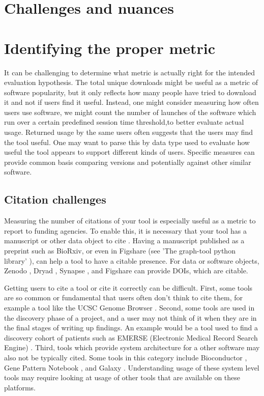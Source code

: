 \documentclass{article}
\begin{document}
\section{Challenges and nuances}

\section{Identifying the proper metric}

 It can be challenging to determine what metric is actually right for the intended evaluation hypothesis. The total unique downloads might be useful as a metric of software popularity, but it only reflects how many people have tried to download it and not if users find it useful. Instead, one might consider measuring how often users use software, we might count the number of launches of the software which run over a certain predefined session time threshold,to better evaluate actual usage. Returned usage by the same users often suggests that the users may find the tool useful. One may want to parse this by data type used to evaluate how useful the tool appears to support different kinds of users.   Specific measures can provide common basis comparing versions and potentially against other similar software. 

\subsection{Citation challenges}
Measuring the number of citations of your tool is especially useful as a metric to report to funding agencies. To enable this, it is necessary that your tool has a manuscript or other data object to cite \cite{chue_hong_software_2019}. Having a manuscript published as a preprint such as BioRxiv, or even in Figshare (see 'The graph-tool python library' \cite{peixoto_graph-tool_2017}), can help a tool to have a citable presence. For data or software objects, Zenodo \cite{zenodo}, Dryad \cite{datadryad}, Synapse \cite{synapse}, and Figshare \cite{figshare} can provide DOIs, which are citable. 

Getting users to cite a tool or cite it correctly can be difficult. First, some tools are so common or fundamental that users often don't think to cite them, for example a tool like the UCSC Genome Browser \cite{ucsc, kent_human_2002}. Second, some tools are used in the discovery phase of a project, and a user may not think of it when they are in the final stages of writing up findings. An example would be a tool used to find a discovery cohort of patients such as EMERSE (Electronic Medical Record Search Engine) \cite{hanauer_supporting_2015}. Third, tools which provide system architecture for a other software may also not be typically cited. Some tools in this category include Bioconductor \cite{bioconductor}, Gene Pattern Notebook \cite{reich_genepattern_2017}, and Galaxy \cite{the_galaxy_community_galaxy_2022}. Understanding usage of these system level tools may require looking at usage of other tools that are available on these platforms.
\end{document}
